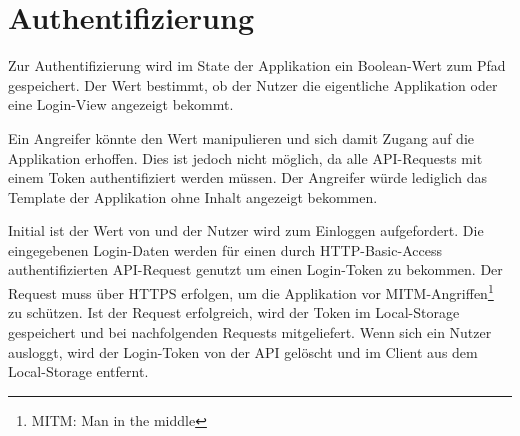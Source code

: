 \section{Authentifizierung}
\label{sec:f_authentifizierung}

Zur Authentifizierung wird im State der Applikation ein Boolean-Wert zum
Pfad  gespeichert.  Der Wert bestimmt, ob der Nutzer
die eigentliche Applikation oder eine Login-View angezeigt bekommt.

Ein Angreifer könnte den Wert manipulieren und sich damit Zugang auf die
Applikation erhoffen.  Dies ist jedoch nicht möglich, da alle API-Requests mit
einem Token authentifiziert werden müssen.  Der Angreifer würde lediglich das
Template der Applikation ohne Inhalt angezeigt bekommen.

Initial ist der Wert von   und der Nutzer
wird zum Einloggen aufgefordert.  Die eingegebenen Login-Daten werden für einen
durch HTTP-Basic-Access~\cite{RFC2617} authentifizierten API-Request genutzt um
einen Login-Token zu bekommen.  Der Request muss über HTTPS erfolgen, um die
Applikation vor MITM-Angriffen\footnote{MITM: Man in the middle} zu schützen.
Ist der Request erfolgreich, wird der Token im Local-Storage~\cite{web-storage}
gespeichert und bei nachfolgenden Requests mitgeliefert.  Wenn sich ein Nutzer
ausloggt, wird der Login-Token von der API gelöscht und im Client aus dem
Local-Storage entfernt.
